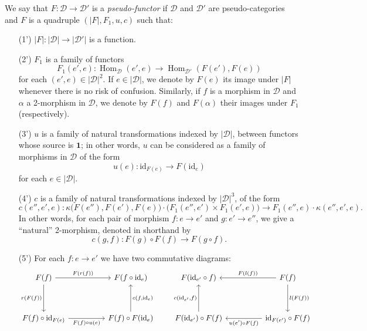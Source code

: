 \documentclass{article}
\newcommand{\id}{\mathrm{id}}
\newcommand{\cat}[1]{\mathcal{#1}}
\newcommand{\set}[1]{|#1|}
\DeclareMathOperator{\Hom}{Hom}
\begin{document}
We say that $F\colon\cat{D}\to\cat{D}'$ is a \emph{pseudo-functor} if $\cat{D}$ and $\cat{D}'$ are pseudo-categories and $F$ is a quadruple $(\set{F},F_1,u,c)$ such that:
\begin{enumerate}
  \item[(1')]
    $\set{F}\colon\set{\cat{D}}\to\set{\cat{D}'}$ is a function.

  \item[(2')]
    $F_1$ is a family of functors
    \[
      F_1(e',e)\colon
      \Hom_\cat{D}(e',e)
      \to \Hom_{\cat{D}'}(F(e'),F(e))
    \]
    for each $(e',e)\in\set{\cat{D}}^2$.
    If $e\in\set{\cat{D}}$, we denote by $F(e)$ its image under $\set{F}$ whenever there is no risk of confusion.
    Similarly, if $f$ is a morphism in $\cat{D}$ and $\alpha$ a 2-morphism in $\cat{D}$, we denote by $F(f)$ and $F(\alpha)$ their images under $F_1$ (respectively).

  \item[(3')]
    $u$ is a family of natural transformations indexed by $\set{\cat{D}}$, between functors whose source is $\mathbf{1}$;
    in other words, $u$ can be considered as a family of morphisms in $\cat{D}$ of the form
    \[
      u(e)\colon
      \id_{F(e)}
      \to F(\id_e)
    \]
    for each $e\in\set{\cat{D}}$.

  \item[(4')]
    $c$ is a family of natural transformations indexed by $\set{\cat{D}}^3$, of the form
    \[
        c(e'',e',e)\colon
        \kappa\big(F(e''),F(e'),F(e)\big) \cdot \big(F_1(e'',e')\times F_1(e',e)\big)
        \to F_1(e'',e)\cdot\kappa(e'',e',e).
    \]
    In other words, for each pair of morphism $f\colon e\to e'$ and $g\colon e'\to e''$, we give a ``natural'' 2-morphism, denoted in shorthand by
    \[
      c(g,f)\colon F(g)\circ F(f)
      \to F(g\circ f).
    \]

  \item[(5')]
    For each $f\colon e\to e'$ we have two commutative diagrams:
    \[
      \begin{tikzcd}[sep=huge]
        F(f)
          \ar[r,"{F(r(f))}"]
          \ar[d,swap,"{r(F(f))}"]
      & F(f\circ\id_e)
      \\F(f)\circ\id_{F(e)}
          \ar[r,swap,"{F(f)\circ u(e)}"]
      & F(f)\circ F(\id_e)
          \ar[u,swap,"{c(f,\id_e)}"]
      \end{tikzcd}
      \qquad
      \begin{tikzcd}[sep=huge]
        F(\id_{e'}\circ f)
      & F(f)
          \ar[l,swap,"{F(l(f))}"]
          \ar[d,"{l(F(f))}"]
      \\F(\id_{e'})\circ F(f)
          \ar[u,"{c(\id_{e'},f)}"]
      & \id_{F(e')}\circ F(f)
          \ar[l,"{u(e')\circ F(f)}"]
      \end{tikzcd}
    \]


\end{enumerate}
\end{document}
